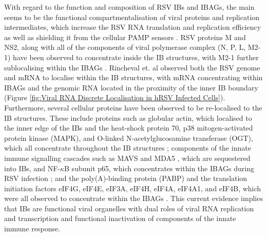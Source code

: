 With regard to the function and composition of RSV IBs and IBAGs, the main seems to be the functional compartmentalisation of viral proteins and replication intermediates, which increase the RSV RNA translation and replication efficiency as well as shielding it from the cellular PAMP sensors \cite{McDonald2004EvidenceAnalysis, Rincheval2017FunctionalVirus, Jobe2020RespiratorySignaling}. RSV proteins M and NS2, along with all of the components of viral polymerase complex (N, P, L, M2-1) have been observed to concentrate inside the IB structures, with M2-1 further sublocalising within the IBAGs \cite{Weber1995NonstructuralSerum, Fricke2013P38Assembly, Rincheval2017FunctionalVirus, Jobe2021BovineResponses}. Rincheval et. al observed both the RSV genome and mRNA to localise within the IB structures, with mRNA concentrating within IBAGs and the genomic RNA located in the proximity of the inner IB boundary \cite{Rincheval2017FunctionalVirus} (Figure \ref{fig:Viral RNA Discrete Localisation in hRSV Infected Cells}). Furthermore, several cellular proteins have been observed to be re-localised to the IB structures. These include proteins such as globular actin, which localised to the inner edge of the IBs \cite{Brown2005EvidenceInfection} and the heat-shock protein 70, p38 mitogen-activated protein kinase (MAPK), and O-linked N-acetylglucosamine transferase (OGT), which all concentrate throughout the IB structures \cite{Brown2005EvidenceInfection, Fricke2013P38Assembly}; components of the innate immune signalling cascades such as MAVS and MDA5 \cite{Lifland2012HumanMAVS}, which are sequestered into IBs, and NF-\(\kappa\)B subunit p65, which concentrates within the IBAGs during RSV infection \cite{Jobe2020RespiratorySignaling}; and the poly(A)-binding protein (PABP) and the translation initiation factors eIF4G, eIF4E, eIF3A, eIF4H, eIF4A, eIF4A1, and eIF4B, which were all observed to concentrate within the IBAGs \cite{Rincheval2017FunctionalVirus, Jobe2023ViralCondensates}. This current evidence implies that IBs are functional viral organelles with dual roles of viral RNA replication and transcription and functional inactivation of components of the innate immune response.

